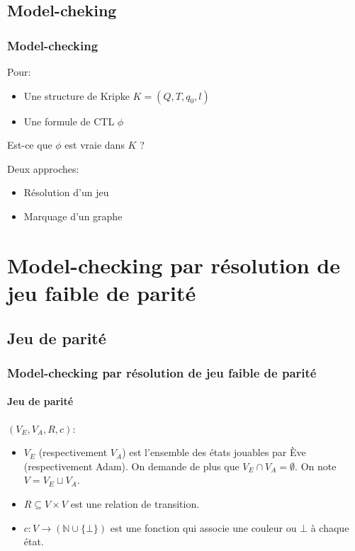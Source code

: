 \documentclass[11pt]{beamer}
\begin{document}
\subsection{Model-cheking}
\begin{frame}
\frametitle{Model-checking}
Pour:
\begin{itemize}
	\item Une structure de Kripke $K = (Q,T, q_0, l)$
	\item Une formule de CTL $\phi$
\end{itemize}
Est-ce que $\phi$ est vraie dans $K$ ?

\bigskip
\pause

Deux approches:
\begin{itemize}
	\item Résolution d'un jeu
	\item Marquage d'un graphe
\end{itemize}
\end{frame}


\section{Model-checking par résolution de jeu faible de parité}
\subsection{Jeu de parité}
\begin{frame}
	\frametitle{Model-checking par résolution de jeu faible de parité}
    \framesubtitle{Jeu de parité}

    $(V_E, V_A, R, c)$:
    \begin{itemize}
        \item $V_E$ (respectivement $V_A$) est l'ensemble des états jouables par Ève (respectivement Adam). On demande de plus que $V_E \cap V_A = \emptyset$. On note $V = V_E \sqcup V_A$.
        \item $R \subseteq V \times V$ est une relation de transition.
        \item $c : V \to (\mathbb{N} \cup \{\bot\})$ est une fonction qui associe une couleur ou $\bot$ à chaque état.
    \end{itemize}
\end{frame}
\end{document}

